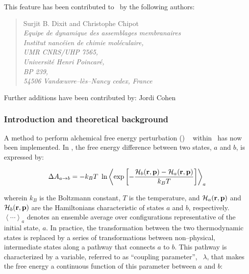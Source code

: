 This feature has been contributed to \NAMD\ by the following authors:

\begin{quote}
   Surjit B. Dixit and Christophe Chipot          \\[0.4cm]
   {\it Equipe de dynamique des assemblages membranaires }\\
   {\it Institut nanc\'eien de chimie mol\'eculaire,  }\\
   {\it UMR CNRS/UHP 7565,                            }\\
   {\it Universit\'e Henri Poincar\'e,                }\\
   {\it BP 239,                                       }\\
   {\it 54506 Vand\oe uvre--l\`es--Nancy cedex, France}
\end{quote}

Further additions have been contributed by: Jordi Cohen 


\subsubsection{Introduction and theoretical background}


A method to perform alchemical free energy perturbation (\FEP)
~\cite{zwan_54_1,Beveridge.89,Gunsteren.89,Straatsma.92,Kollman.93,Gilson.97,
Mark.98,chip_01_1} within \NAMD\ has now been implemented. 
In \FEP, the free energy difference between two states,
$a$ and $b$, is expressed by:

\begin{equation}
\label{master}
\Delta A_{a \rightarrow b} = -k_B T \ \ln
\left< \exp\left[-\frac{{\cal H}_b({\bf r}, {\bf p}) - 
                         {\cal H}_a({\bf r}, {\bf p})}
                        {k_B T}\right]
\right>_a
\end{equation}

wherein $k_B$ is the Boltzmann constant, $T$ is the temperature,
and ${\cal H}_a({\bf r}, {\bf p})$ and ${\cal H}_b({\bf r}, {\bf p})$
are the Hamiltonians characteristic of states $a$ and $b$, respectively.
$\left< \cdots \right>_a$ denotes an ensemble average over configurations
representative of the initial state, $a$.
In practice, the transformation between the two thermodynamic states
is replaced by a series of transformations between non--physical,
intermediate states along a pathway that connects $a$ to $b$.
This pathway is characterized by a variable, referred to as
``coupling parameter'',~\cite{Beveridge.89,Mark.98,king_93_1} 
$\lambda$, that makes the free energy
a continuous function of this parameter between $a$ and $b$:

